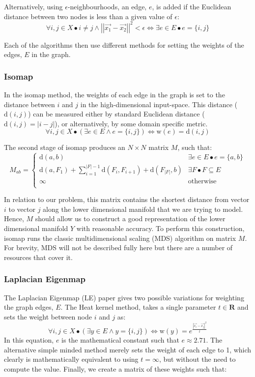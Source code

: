 \documentclass{article}
\begin{document}
Alternatively, using $\epsilon$-neighbourhoods, an edge, $e$, is added if the Euclidean distance between two nodes is less than a given value of $\epsilon$:
\[ \forall i, j \in X \bullet i \ne j \land \left|\left|\vec{x_1} - \vec{x_2}\right|\right|^2 < \epsilon \Leftrightarrow \exists e \in E \bullet e = \{i, j\} \]

Each of the algorithms then use different methods for setting the weights of the edges, $E$ in the graph.

\subsubsection{Isomap}
In the isomap method, the weights of each edge in the graph is set to the distance between $i$ and $j$ in the high-dimensional input-space. This distance ($\mathrm{d}(i, j)$) can be measured either by standard Euclidean distance ($\mathrm{d}(i, j) = \left|i - j\right|$), or alternatively, by some domain specific metric.
\[\forall i,j \in X \bullet (\exists e \in E \land e = \{i, j\}) \Leftrightarrow \mathrm{w}(e) = \mathrm{d}(i, j) \]

The second stage of isomap produces an $N \times N$ matrix $M$, such that:
\[M_{ab} = \left\{
\begin{array}{ll}
      \mathrm{d}(a, b) & \exists e \in E \bullet e = \{a, b\} \\
      \mathrm{d}(a, F_1) + \sum_{i = 1}^{\left|F\right| - 1} \mathrm{d}(F_i, F_{i+1}) + \mathrm{d}(F_{\left|F\right|}, b) & \exists F \bullet F \subseteq E \\
      \infty & \mathrm{otherwise} \\
\end{array} 
\right.\]

In relation to our problem, this matrix contains the shortest distance from vector $i$ to vector $j$ along the lower dimensional manifold that we are trying to model. Hence, $M$ should allow us to construct a good representation of the lower dimensional manifold $Y$ with reasonable accuracy. To perform this construction, isomap runs the classic multidimensional scaling (MDS) algorithm on matrix $M$. For brevity, MDS will not be described fully here but there are a number of resources that cover it\cite[pp. 570-572]{stats_1}\cite{mds-1}.

\subsubsection{Laplacian Eigenmap}
\label{weights-heat-kernel}
The Laplacian Eigenmap (LE) paper gives two possible variations for weighting the graph edges, $E$. The Heat kernel method, takes a single parameter $t \in \mathbf{R}$ and sets the weight between node $i$ and $j$ as:
\[\forall i,j \in X \bullet (\exists y \in E \land y = \{i, j\}) \Leftrightarrow \mathrm{w}(y) = e^{\frac{\left|\vec{x_i} - \vec{x_j}\right|^2}{t}} \]
In this equation, $e$ is the mathematical constant such that $e \approx 2.71$. The alternative simple minded method merely sets the weight of each edge to 1, which clearly is mathematically equivalent to using $t = \infty$, but without the need to compute the value. Finally, we create a matrix of these weights such that:
\end{document}
